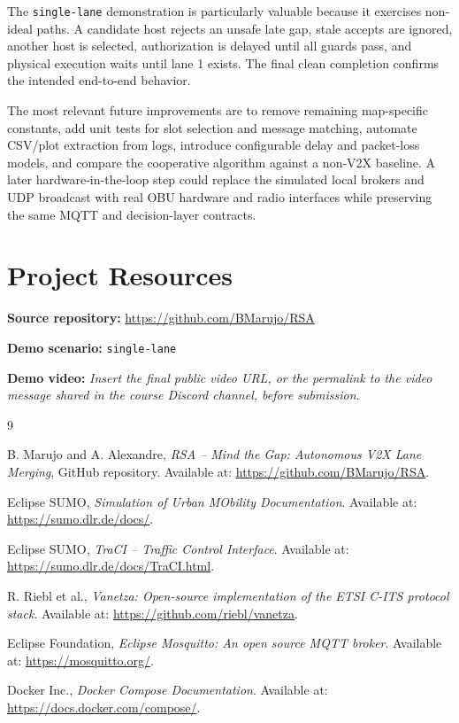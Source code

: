 \documentclass[a4paper,12pt]{article}
\newcommand{\repositoryURL}{https://github.com/BMarujo/RSA}
\begin{document}
The \texttt{single-lane} demonstration is particularly valuable because it exercises non-ideal paths. A candidate host rejects an unsafe late gap, stale accepts are ignored, another host is selected, authorization is delayed until all guards pass, and physical execution waits until lane 1 exists. The final clean completion confirms the intended end-to-end behavior.

The most relevant future improvements are to remove remaining map-specific constants, add unit tests for slot selection and message matching, automate CSV/plot extraction from logs, introduce configurable delay and packet-loss models, and compare the cooperative algorithm against a non-V2X baseline. A later hardware-in-the-loop step could replace the simulated local brokers and UDP broadcast with real OBU hardware and radio interfaces while preserving the same MQTT and decision-layer contracts.

\section{Project Resources}

\textbf{Source repository:} \href{\repositoryURL}{\repositoryURL}

\textbf{Demo scenario:} \texttt{single-lane}

\textbf{Demo video:} \emph{Insert the final public video URL, or the permalink to the video message shared in the course Discord channel, before submission.}

\begin{thebibliography}{9}

B. Marujo and A. Alexandre,
\textit{RSA -- Mind the Gap: Autonomous V2X Lane Merging},
GitHub repository. Available at: \url{https://github.com/BMarujo/RSA}.

Eclipse SUMO,
\textit{Simulation of Urban MObility Documentation}.
Available at: \url{https://sumo.dlr.de/docs/}.

Eclipse SUMO,
\textit{TraCI -- Traffic Control Interface}.
Available at: \url{https://sumo.dlr.de/docs/TraCI.html}.

R. Riebl et al.,
\textit{Vanetza: Open-source implementation of the ETSI C-ITS protocol stack}.
Available at: \url{https://github.com/riebl/vanetza}.

Eclipse Foundation,
\textit{Eclipse Mosquitto: An open source MQTT broker}.
Available at: \url{https://mosquitto.org/}.

Docker Inc.,
\textit{Docker Compose Documentation}.
Available at: \url{https://docs.docker.com/compose/}.

\end{thebibliography}
\end{document}
